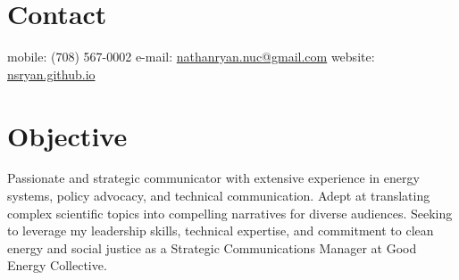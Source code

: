 \documentclass[margin,line]{resume}
\begin{document}
\begin{resume}

%


    \section{\mysidestyle Contact}
    mobile: (708) 567-0002 \hfill e-mail: \href{mailto:nathanryan.nuc@gmail.com}{nathanryan.nuc@gmail.com} \hfill website: \href{https://nsryan.github.io}{nsryan.github.io} \vspace{0mm}\\\vspace{1mm}%

    \vspace{-6mm}
    \section{\mysidestyle Objective}
                Passionate and strategic communicator with extensive experience in energy systems, policy advocacy, and technical communication. Adept at translating complex scientific topics into compelling narratives for diverse audiences. Seeking to leverage my leadership skills, technical expertise, and commitment to clean energy and social justice as a Strategic Communications Manager at Good Energy Collective.

\end{resume}
\end{document}
